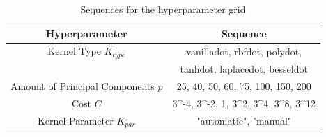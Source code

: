 \documentclass[conference]{IEEEtran}
\begin{document}
\begin{table}[htbp]
    \color{maxim}
    \caption{\color{maxim}Sequences for the hyperparameter grid}
    \begin{center}
    \begin{tabular}{|c|c|}
        \hline
        \textbf{Hyperparameter} & \textbf{Sequence} \\
        \hline
        Kernel Type $K_{type}$ & vanilladot, rbfdot, polydot,\\ 
        & tanhdot, laplacedot, besseldot\\
        \hline
        Amount of Principal Components $p$ & 25, 40, 50, 60, 75, 100, 150, 200\\
        \hline
        Cost $C$ & 3^{-4}, 3^{-2}, 1, 3^2, 3^4, 3^8, 3^{12}\\
        \hline
        Kernel Parameter $K_{par}$ & "automatic", "manual"\\
        \hline
    \end{tabular}
    \label{table:gridParamSVM}
    \end{center}
\end{table}
\end{document}
